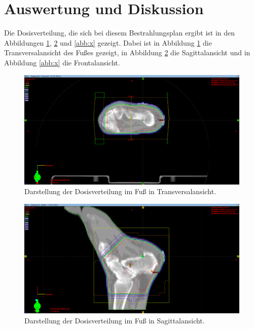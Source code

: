 \section{Auswertung und Diskussion}
\label{sec:Auswertung}

Die Dosisverteilung, die sich bei diesem Bestrahlungsplan ergibt ist in den
Abbildungen \ref{abb:z}, \ref{abb:y} und \ref{abb:x} gezeigt. Dabei ist in
Abbildung \ref{abb:z} die Transversalansicht des Fußes gezeigt, in Abbildung \ref{abb:y}
die Sagittalansicht und in Abbildung \ref{abb:x} die Frontalansicht.

\begin{figure}[H]
  \centering
  \includegraphics[width=\textwidth]{Bilder/ZAnsicht.png}
  \caption{Darstellung der Dosisverteilung im Fuß in Transversalansicht.}
  \label{abb:z}
\end{figure}

\begin{figure}[H]
  \centering
  \includegraphics[width=\textwidth]{Bilder/YAnsicht.png}
  \caption{Darstellung der Dosisverteilung im Fuß in Sagittalansicht.}
  \label{abb:y}
\end{figure}

